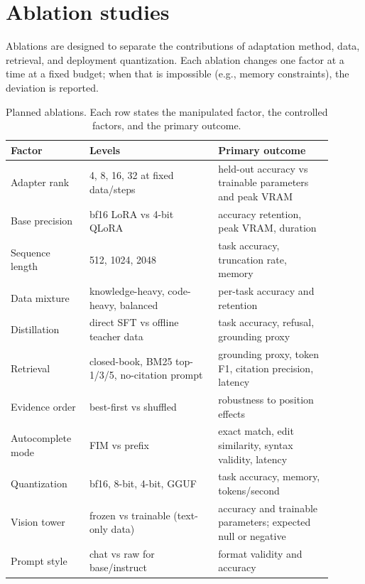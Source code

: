 \section{Ablation studies}
\label{sec:ablations}

Ablations are designed to separate the contributions of adaptation method, data,
retrieval, and deployment quantization. Each ablation changes one factor at a
time at a fixed budget; when that is impossible (e.g., memory constraints), the
deviation is reported.

\begin{table}[t]
\centering
\small
\caption{Planned ablations. Each row states the manipulated factor, the
controlled factors, and the primary outcome.}
\label{tab:ablations}
\begin{tabular}{@{}p{0.22\linewidth}p{0.36\linewidth}p{0.32\linewidth}@{}}
\toprule
Factor & Levels & Primary outcome \\
\midrule
Adapter rank & 4, 8, 16, 32 at fixed data/steps & held-out accuracy vs trainable parameters and peak VRAM \\
Base precision & bf16 LoRA vs 4-bit QLoRA & accuracy retention, peak VRAM, duration \\
Sequence length & 512, 1024, 2048 & task accuracy, truncation rate, memory \\
Data mixture & knowledge-heavy, code-heavy, balanced & per-task accuracy and retention \\
Distillation & direct SFT vs offline teacher data & task accuracy, refusal, grounding proxy \\
Retrieval & closed-book, BM25 top-1/3/5, no-citation prompt & grounding proxy, token F1, citation precision, latency \\
Evidence order & best-first vs shuffled & robustness to position effects \\
Autocomplete mode & FIM vs prefix & exact match, edit similarity, syntax validity, latency \\
Quantization & bf16, 8-bit, 4-bit, GGUF & task accuracy, memory, tokens/second \\
Vision tower & frozen vs trainable (text-only data) & accuracy and trainable parameters; expected null or negative \\
Prompt style & chat vs raw for base/instruct & format validity and accuracy \\
\bottomrule
\end{tabular}
\end{table}

